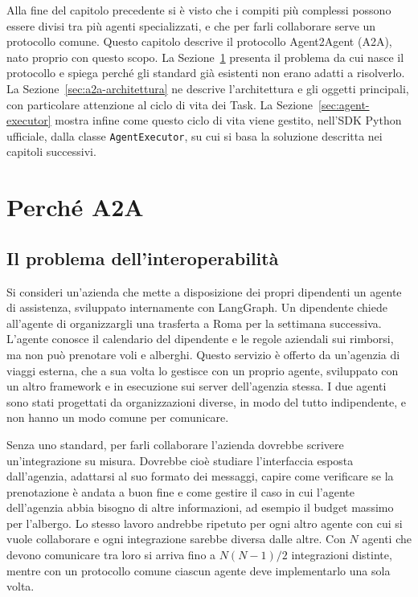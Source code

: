 \label{cap:protocollo-a2a}

Alla fine del capitolo precedente si è visto che i compiti più complessi possono essere divisi tra più agenti specializzati, e che per farli collaborare
 serve un protocollo comune. Questo capitolo descrive il protocollo Agent2Agent (A2A), nato proprio con questo scopo. La Sezione~\ref{sec:perche-a2a} presenta 
 il problema da cui nasce il protocollo e spiega perché gli standard già esistenti non erano adatti a risolverlo. La Sezione~\ref{sec:a2a-architettura} ne descrive
  l'architettura e gli oggetti principali, con particolare attenzione al ciclo di vita dei Task. La Sezione~\ref{sec:agent-executor} mostra infine come questo ciclo
   di vita viene gestito, nell'SDK Python ufficiale, dalla classe \texttt{AgentExecutor}, su cui si basa la soluzione descritta nei capitoli successivi.

\section{Perché A2A}
\label{sec:perche-a2a}

\subsection{Il problema dell'interoperabilità}

Si consideri un'azienda che mette a disposizione dei propri dipendenti un agente di assistenza, sviluppato internamente con LangGraph.
 Un dipendente chiede all'agente di organizzargli una trasferta a Roma per la settimana successiva. L'agente conosce il calendario del 
 dipendente e le regole aziendali sui rimborsi, ma non può prenotare voli e alberghi. Questo servizio è offerto da un'agenzia di viaggi esterna,
  che a sua volta lo gestisce con un proprio agente, sviluppato con un altro framework e in esecuzione sui server dell'agenzia stessa. I due agenti 
  sono stati progettati da organizzazioni diverse, in modo del tutto indipendente, e non hanno un modo comune per comunicare.

Senza uno standard, per farli collaborare l'azienda dovrebbe scrivere un'integrazione su misura. Dovrebbe cioè studiare l'interfaccia esposta dall'agenzia, 
adattarsi al suo formato dei messaggi, capire come verificare se la prenotazione è andata a buon fine e come gestire il caso in cui l'agente dell'agenzia abbia bisogno 
di altre informazioni, ad esempio il budget massimo per l'albergo. Lo stesso lavoro andrebbe ripetuto per ogni altro agente con cui si vuole collaborare e ogni
integrazione sarebbe diversa dalle altre. Con $N$ agenti che devono comunicare tra loro si arriva fino a $N(N-1)/2$ integrazioni distinte, mentre con un protocollo
 comune ciascun agente deve implementarlo una sola volta.

